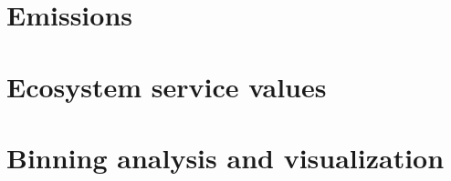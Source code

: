 	\section{Emissions}

	\section{Ecosystem service values}

	\section{Binning analysis and visualization}






